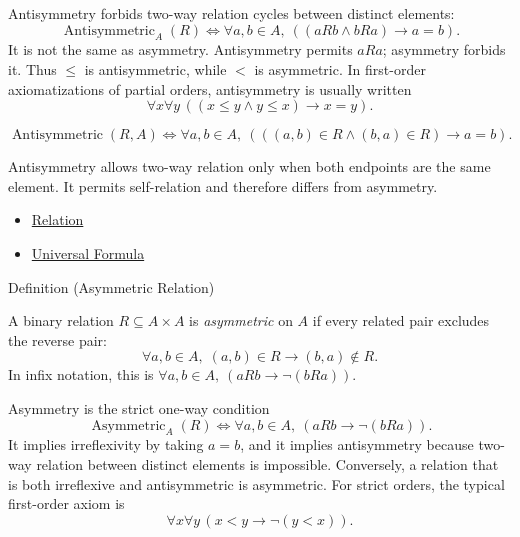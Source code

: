 \begin{remark*}
Antisymmetry forbids two-way relation cycles between distinct elements:
\[
  \operatorname{Antisymmetric}_A(R)
  \iff
  \forall a,b\in A,\ ((aRb\land bRa)\rightarrow a=b).
\]
It is not the same as asymmetry. Antisymmetry permits $aRa$; asymmetry forbids
it. Thus $\leq$ is antisymmetric, while $<$ is asymmetric. In first-order
axiomatizations of partial orders, antisymmetry is usually written
\[
  \forall x\forall y\,((x\leq y\land y\leq x)\rightarrow x=y).
\]
\end{remark*}

\begin{remark*}
\[
  \operatorname{Antisymmetric}(R,A)
  \iff
  \forall a,b\in A,\ (((a,b)\in R\land(b,a)\in R)\to a=b).
\]
\end{remark*}

\begin{remark*}[Interpretation]
Antisymmetry allows two-way relation only when both endpoints are the same
element. It permits self-relation and therefore differs from asymmetry.
\end{remark*}

\begin{dependencies}
\begin{itemize}
  \item \hyperref[def:relation]{Relation}
  \item \hyperref[def:universal-q]{Universal Formula}
\end{itemize}
\end{dependencies}

\begin{definitionbox}{Definition (Asymmetric Relation)}
\begin{definition}\label{def:asymmetric}
A binary relation $R\subseteq A\times A$ is \emph{asymmetric} on $A$ if every
related pair excludes the reverse pair:
\[
  \forall a,b\in A,\;
  (a,b)\in R \rightarrow (b,a)\notin R.
\]
In infix notation, this is
$\forall a,b\in A,\ (aRb\rightarrow\neg(bRa))$.
\end{definition}
\end{definitionbox}


\begin{remark*}
Asymmetry is the strict one-way condition
\[
  \operatorname{Asymmetric}_A(R)
  \iff
  \forall a,b\in A,\ (aRb\rightarrow\neg(bRa)).
\]
It implies irreflexivity by taking $a=b$, and it implies antisymmetry because
two-way relation between distinct elements is impossible. Conversely, a
relation that is both irreflexive and antisymmetric is asymmetric. For strict
orders, the typical first-order axiom is
\[
  \forall x\forall y\,(x<y\rightarrow\neg(y<x)).
\]
\end{remark*}

